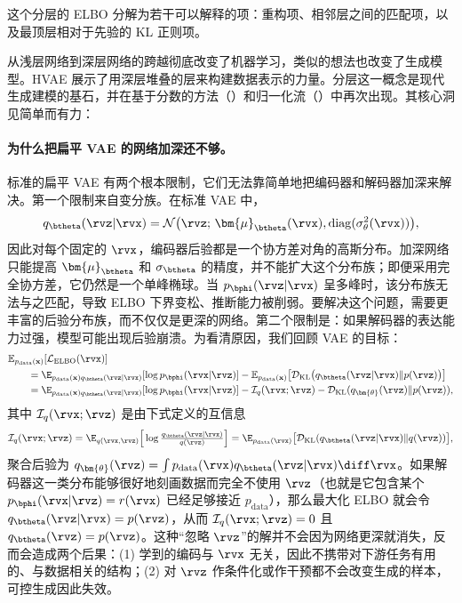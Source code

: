 这个分层的 ELBO 分解为若干可以解释的项：重构项、相邻层之间的匹配项，以及最顶层相对于先验的 KL 正则项。

从浅层网络到深层网络的跨越彻底改变了机器学习，类似的想法也改变了生成模型。HVAE 展示了用深层堆叠的层来构建数据表示的力量。分层这一概念是现代生成建模的基石，并在基于分数的方法（）和归一化流（）中再次出现。其核心洞见简单而有力：


\paragraph{为什么把扁平 VAE 的网络加深还不够。} 标准的扁平 VAE 有两个根本限制，它们无法靠简单地把编码器和解码器加深来解决。第一个限制来自变分族。在标准 VAE 中，
\[
q_\btheta(\rvz| \rvx)=\mathcal N \big(\rvz;\,\bm{\mu}_{\btheta}(\rvx), \operatorname{diag}(\sigma_\theta^2(\rvx))\big),
\]
因此对每个固定的 $\rvx$，编码器后验都是一个协方差对角的高斯分布。加深网络只能提高 $\bm{\mu}_{\btheta}$ 和
$\sigma_\btheta$ 的精度，并不能扩大这个分布族；即便采用完全协方差，它仍然是一个单峰椭球。当 $p_\bphi(\rvz| \rvx)$ 呈多峰时，该分布族无法与之匹配，导致 ELBO 下界变松、推断能力被削弱。要解决这个问题，需要更丰富的后验分布族，而不仅仅是更深的网络。第二个限制是：如果解码器的表达能力过强，模型可能出现后验崩溃。为看清原因，我们回顾 VAE 的目标：
\begin{align*}
&\mathbb{E}_{p_{\text{data}}(\mathbf{x})}[\mathcal L_{\mathrm{ELBO}}(\rvx)]\\
&\quad\quad=\E_{p_{\text{data}}(\mathbf{x})q_\btheta(\rvz|\rvx)}[\log p_\bphi(\rvx|\rvz)]
-\mathbb{E}_{p_{\text{data}}(\mathbf{x})}\big[\mathcal{D}_\mathrm{KL} \big(q_\btheta(\rvz|\rvx) \| p(\rvz)\big)\big]\\
&\quad\quad=\E_{p_{\text{data}}(\mathbf{x})q_\btheta(\rvz|\rvx)}[\log p_\bphi(\rvx|\rvz)]-\mathcal I_q(\rvx;\rvz) - \mathcal{D}_\mathrm{KL}(q_{\bm{\theta}}(\rvz) \| p(\rvz)),
\end{align*}
其中 $\mathcal I_q(\rvx;\rvz)$ 是由下式定义的互信息
\[
\mathcal I_q(\rvx;\rvz)
=\E_{q(\rvx,\rvz)} \Big[\log \tfrac{q_\btheta(\rvz|\rvx)}{q(\rvz)}\Big]
=\E_{p_{\mathrm{data}}(\rvx)} \big[\mathcal{D}_\mathrm{KL}(q_\btheta(\rvz|\rvx) \| q(\rvz))\big],
\]
聚合后验为 $q_{\bm{\theta}}(\rvz)= \int p_{\mathrm{data}}(\rvx) q_\btheta(\rvz|\rvx) \diff\rvx$。如果解码器这一类分布能够很好地刻画数据而完全不使用 $\rvz$（也就是它包含某个 $p_\bphi(\rvx|\rvz)=r(\rvx)$ 已经足够接近 $p_{\mathrm{data}}$），那么最大化 ELBO 就会令 $q_\btheta(\rvz|\rvx)=p(\rvz)$，从而 $\mathcal I_q(\rvx;\rvz)=0$ 且 $q_\btheta(\rvz)=p(\rvz)$。这种``忽略 $\rvz$''的解并不会因为网络更深就消失，反而会造成两个后果：(1) 学到的编码与 $\rvx$ 无关，因此不携带对下游任务有用的、与数据相关的结构；(2) 对 $\rvz$ 作条件化或作干预都不会改变生成的样本，可控生成因此失效。


